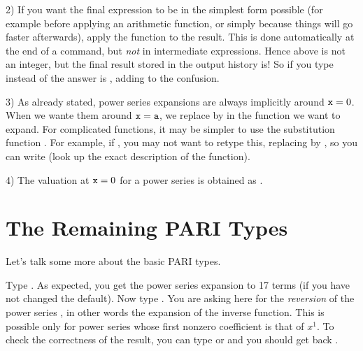 2) If you want the final expression to be in the simplest form possible (for
example before applying an arithmetic function, or simply because things will
go faster afterwards), apply the function  to the result.
This is done automatically at the end of a  command, but
\emph{not} in intermediate expressions. Hence  above is not an
integer, but the final result stored in the output history is! So
if you type  instead of  the answer is
, adding to the confusion.

3) As already stated, power series expansions are always implicitly around
${\tt x} = 0$. When we wante them around ${\tt x} = {\tt a}$, we replace
 by  in the function we want to expand. For complicated
functions, it may be simpler to use the substitution function .
For example, if ,
you may not want to retype this, replacing  by , so you can
write  (look up the exact description of the
 function).

4) The valuation at ${\tt x} = 0$ for a power series  is obtained
as .

\section{The Remaining PARI Types}
Let's talk some more about the basic PARI types.

Type . As expected, you get the power series expansion
to 17 terms (if you have not changed the default). Now type
. You are asking here for the \emph{reversion} of the
power series , in other words the expansion of the inverse function.
This is possible only for power series whose first nonzero coefficient is
that of $x^1$.  To check the correctness of the result, you can type
 or  and you should get back
.

